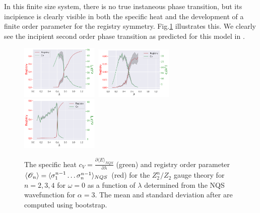 	In this finite size system, there is no true instaneous phase transition, but its incipience is clearly visible in both the specific heat and the development of a finite order parameter for the registry symmetry. Fig.\ref{fig:regCv2fields} illustrates this. We clearly see the incipient second order phase transition as predicted for this model in \cite{Bukva:Registry}.
	\begin{figure}[t]
		\centering
		\mbox{\includegraphics[width=0.33\textwidth]{figures/chapter3/2FieldsCVReg.pdf}
			\includegraphics[width=0.33\textwidth]{figures/chapter3/3FieldsCVReg.pdf}
			\includegraphics[width=0.33\textwidth]{figures/chapter3/4FieldsCVReg.pdf}}
		\caption{The specific heat $c_V=\frac{\partial \langle E\rangle_{NQS}}{\partial \lambda}$ (green) and registry order parameter $\langle{\cal O}_n\rangle =\langle\sigma_1^{n-1}\ldots\sigma_n^{n-1}\rangle_{NQS}$ (red) for the $Z_2^n/Z_2$ gauge theory for $n=2,3,4$ for $\omega=0$ as a function of $\lambda$ determined from the NQS wavefunction for $\alpha = 3$. The mean and standard deviation after are computed using bootstrap.  
		}
		\label{fig:regCv2fields}
	\end{figure}
	
